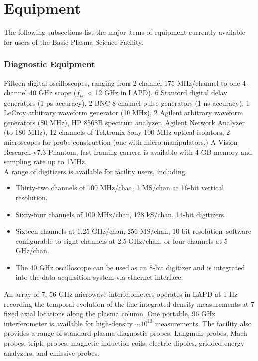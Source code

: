 \documentclass[11pt]{article}
\date{}
\title{}
\begin{document}
\section{Equipment}
The following subsections list the major items of equipment currently available for users of the Basic Plasma Science Facility.

\subsubsection{Diagnostic Equipment}
Fifteen digital oscilloscopes, ranging from 2 channel-175 MHz/channel to one 4-channel 40 GHz scope ($f_{pe}$ < 12 GHz in LAPD), 6 Stanford digital delay generators (1 ps accuracy), 2 BNC 8 channel pulse generators (1 ns accuracy), 1 LeCroy arbitrary waveform generator (10 MHz), 2 Agilent arbitrary waveform generators (80 MHz), HP 8568B spectrum analyzer, Agilent Network Analyzer (to 180 MHz), 12 channels of Tektronix-Sony 100 MHz optical isolators, 2 microscopes for probe construction (one with micro-manipulators.) A Vision Research v7.3 Phantom, fast-framing camera is available with 4 GB memory and sampling rate up to 1MHz.\\
	A range of digitizers is available for facility users, including
\begin{itemize}
\item Thirty-two channels of 100 MHz/chan, 1 MS/chan at 16-bit vertical resolution.
\item Sixty-four  channels of 100 MHz/chan, 128 kS/chan, 14-bit digitizers.
\item Sixteen channels at 1.25 GHz/chan, 256 MS/chan, 10 bit resolution--software configurable  to eight channels at 2.5 GHz/chan, or four channels at 5 GHz/chan.

\item The 40 GHz oscilloscope can be used as an 8-bit digitizer and is integrated into the data acquisition system via ethernet interface.
\end{itemize}
	An array of 7, 56 GHz microwave interferometers operates in LAPD at 1 Hz recording the temporal evolution of the line-integrated density measurements at 7 fixed axial locations along the plasma column. One portable, 96 GHz interferometer is available for high-density $ \sim 10^{13}$ measurements. The facility also provides a range of standard plasma diagnostic probes: Langmuir probes, Mach probes, triple probes, magnetic induction coils, electric dipoles, gridded energy analyzers, and emissive probes.
\end{document}
